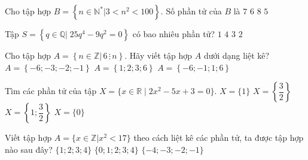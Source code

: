 \begin{ex}%
	Cho tập  hợp $B=\left\{n \in \mathbb{N}^*\bigg|3<n^2<100\right\}$. Số phần tử của $B$ là
	 \choice
		 {$7$}
		{$6$} 
		 {\True $8$}
		 {$5$}
\end{ex}

\begin{ex}%
	Tập $S=\left\{q \in \mathbb{Q}|\; 25q^4-9q^2=0\right\}$ có bao nhiêu phần  tử?
	\choice 
		{$1$} 
		{$4$} 
		{\True  $3$}
		{$2$} 
\end{ex}

\begin{ex}%
	Cho tập hợp $A = \left\{n \in \mathbb{Z}\big| \,6 \, \vdots \, n\right\}$. Hãy  viết tập hợp $A$ dưới dạng liệt kê?
		 {$A = \left\{-6;-3;-2;-1\right\}$}
		{$A = \left\{1;2;3;6\right\}$} 
		{$A  = \left\{-6;-1;1;6\right\}$}
\end{ex}

\begin{ex}%
	Tìm các phần tử  của tập $X=\{x \in \mathbb{R} \mid 2x^2-5x+3=0\}$.
	\choice 
		 { $X=\{1\}$}
		{$X=\left\{  \dfrac{3}{2}\right\}$}
		{\True $X=\left\{  1; \dfrac{3}{2}\right\}$}
		 {$X=\{0\}$}
\end{ex}

\begin{ex}%
	Viết tập hợp $A=\lbrace x \in \mathbb{Z}|x^2<17 \rbrace  $ theo cách liệt kê các phần tử, ta được tập hợp nào sau đây?
		{$  \lbrace 1;2;3;4 \rbrace $}
		{$\lbrace 0;1;2;3;4 \rbrace $} 
		{$ \lbrace -4; -3;-2;-1  \rbrace $}
\end{ex}

